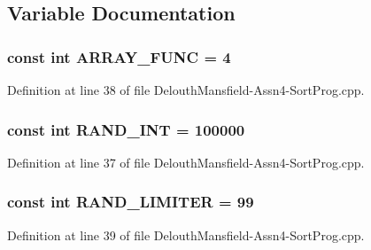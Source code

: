 \subsection{Variable Documentation}
\hypertarget{_delouth_mansfield-_assn4-_sort_prog_8cpp_a3b95dd60d5c45f7cc3733769f3d54868}{
\subsubsection[{ARRAY\_\-FUNC}]{\setlength{\rightskip}{0pt plus 5cm}const int {\bf ARRAY\_\-FUNC} = 4}}
\label{_delouth_mansfield-_assn4-_sort_prog_8cpp_a3b95dd60d5c45f7cc3733769f3d54868}


Definition at line 38 of file DelouthMansfield-\/Assn4-\/SortProg.cpp.

\hypertarget{_delouth_mansfield-_assn4-_sort_prog_8cpp_a134c2ba56ae9ba89c77a5c0dba9f2124}{
\subsubsection[{RAND\_\-INT}]{\setlength{\rightskip}{0pt plus 5cm}const int {\bf RAND\_\-INT} = 100000}}
\label{_delouth_mansfield-_assn4-_sort_prog_8cpp_a134c2ba56ae9ba89c77a5c0dba9f2124}


Definition at line 37 of file DelouthMansfield-\/Assn4-\/SortProg.cpp.

\hypertarget{_delouth_mansfield-_assn4-_sort_prog_8cpp_ad454298170f7805366a1aa2da04df23a}{
\subsubsection[{RAND\_\-LIMITER}]{\setlength{\rightskip}{0pt plus 5cm}const int {\bf RAND\_\-LIMITER} = 99}}
\label{_delouth_mansfield-_assn4-_sort_prog_8cpp_ad454298170f7805366a1aa2da04df23a}


Definition at line 39 of file DelouthMansfield-\/Assn4-\/SortProg.cpp.

